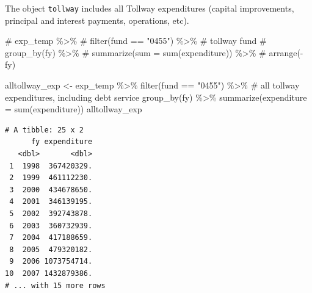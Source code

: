 \documentclass[
  letterpaper,
  DIV=11,
  numbers=noendperiod]{scrreport}
\newenvironment{Shaded}{\begin{snugshade}}{\end{snugshade}}
\newcommand{\AttributeTok}[1]{\textcolor[rgb]{0.40,0.45,0.13}{#1}}
\newcommand{\CommentTok}[1]{\textcolor[rgb]{0.37,0.37,0.37}{#1}}
\newcommand{\FunctionTok}[1]{\textcolor[rgb]{0.28,0.35,0.67}{#1}}
\newcommand{\NormalTok}[1]{\textcolor[rgb]{0.00,0.23,0.31}{#1}}
\newcommand{\OtherTok}[1]{\textcolor[rgb]{0.00,0.23,0.31}{#1}}
\newcommand{\SpecialCharTok}[1]{\textcolor[rgb]{0.37,0.37,0.37}{#1}}
\newcommand{\StringTok}[1]{\textcolor[rgb]{0.13,0.47,0.30}{#1}}
\begin{document}
The object \texttt{tollway} includes all Tollway expenditures (capital
improvements, principal and interest payments, operations, etc).

\begin{Shaded}
\begin{Highlighting}[]
\CommentTok{\# exp\_temp \%\textgreater{}\% }
\CommentTok{\#   filter(fund == "0455") \%\textgreater{}\%       \# tollway fund}
\CommentTok{\#   group\_by(fy) \%\textgreater{}\% }
\CommentTok{\#   summarize(sum = sum(expenditure)) \%\textgreater{}\% }
\CommentTok{\#   arrange({-}fy)}

\NormalTok{alltollway\_exp }\OtherTok{\textless{}{-}}\NormalTok{ exp\_temp }\SpecialCharTok{\%\textgreater{}\%} 
  \FunctionTok{filter}\NormalTok{(fund }\SpecialCharTok{==} \StringTok{"0455"}\NormalTok{) }\SpecialCharTok{\%\textgreater{}\%} \CommentTok{\# all tollway expenditures, including debt service}
  \FunctionTok{group\_by}\NormalTok{(fy) }\SpecialCharTok{\%\textgreater{}\%} 
  \FunctionTok{summarize}\NormalTok{(}\AttributeTok{expenditure =} \FunctionTok{sum}\NormalTok{(expenditure))}
\NormalTok{alltollway\_exp}
\end{Highlighting}
\end{Shaded}

\begin{verbatim}
# A tibble: 25 x 2
      fy expenditure
   <dbl>       <dbl>
 1  1998  367420329.
 2  1999  461112230.
 3  2000  434678650.
 4  2001  346139195.
 5  2002  392743878.
 6  2003  360732939.
 7  2004  417188659.
 8  2005  479320182.
 9  2006 1073754714.
10  2007 1432879386.
# ... with 15 more rows
\end{verbatim}
\end{document}
